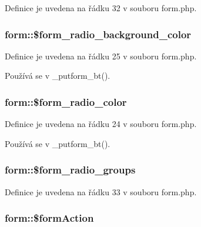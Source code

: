 Definice je uvedena na řádku 32 v souboru form.\-php.

\hypertarget{classform_ad50b5b6d442dc295c8c8e65f7b49c42d}{
\subsubsection[{\$form\-\_\-radio\-\_\-background\-\_\-color}]{\setlength{\rightskip}{0pt plus 5cm}form\-::\$form\-\_\-radio\-\_\-background\-\_\-color}}\label{classform_ad50b5b6d442dc295c8c8e65f7b49c42d}


Definice je uvedena na řádku 25 v souboru form.\-php.



Používá se v \-\_\-putform\-\_\-bt().

\hypertarget{classform_a9b89418280fe2385669b6fafdf861a42}{
\subsubsection[{\$form\-\_\-radio\-\_\-color}]{\setlength{\rightskip}{0pt plus 5cm}form\-::\$form\-\_\-radio\-\_\-color}}\label{classform_a9b89418280fe2385669b6fafdf861a42}


Definice je uvedena na řádku 24 v souboru form.\-php.



Používá se v \-\_\-putform\-\_\-bt().

\hypertarget{classform_a163d1f36c65e76a18eb3d6ed25b71a53}{
\subsubsection[{\$form\-\_\-radio\-\_\-groups}]{\setlength{\rightskip}{0pt plus 5cm}form\-::\$form\-\_\-radio\-\_\-groups}}\label{classform_a163d1f36c65e76a18eb3d6ed25b71a53}


Definice je uvedena na řádku 33 v souboru form.\-php.

\hypertarget{classform_a78e01a727f5e89bc37251c85a52b6d77}{
\subsubsection[{\$form\-Action}]{\setlength{\rightskip}{0pt plus 5cm}form\-::\$form\-Action}}\label{classform_a78e01a727f5e89bc37251c85a52b6d77}


